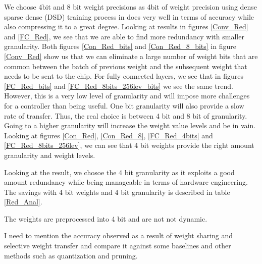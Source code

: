 \documentclass[conference]{IEEEtran}
\begin{document}
We choose 4bit and 8 bit weight precisions as 4bit of weight precision using dense sparse dense (DSD) training process in \cite{han2016dsd} does very well in terms of accuracy while also compressing it to a great degree. Looking at results in figures \ref{Conv_Red} and \ref{FC_Red}, we see that 
we are able to find more redundancy with smaller granularity. Both figures \ref{Con_Red_bits} and \ref{Con_Red_8_bits} in figure \ref{Conv_Red} show us that we can eliminate a large number of weight bits that are common between the batch of previous weight and the subsequent weight that needs to be sent to the chip. For fully connected layers, we see that in figures \ref{FC_Red_bits} and  \ref{FC_Red_8bits_256lev_bits} we see the same trend. However, this is a very low level of granularity and will impose more challenges for a controller than being useful. One bit granularity will also provide a slow rate of transfer. Thus, the real choice is between 4 bit and 8 bit of granularity. Going to a higher granularity will increase the weight value levels and be in vain. Looking at figures \ref{Con_Red}, \ref{Con_Red_8}, \ref{FC_Red_4bits} and \ref{FC_Red_8bits_256lev}, we can see that 4 bit weights provide the right amount granularity and weight levels. 

Looking at the result, we chosoe the 4 bit granularity as it exploits a good amount redundancy while being manageable in terms of hardware engineering. The savings with 4 bit weights and 4 bit granularity is described in table \ref{Red_Anal}.

\color{red}
The weights are preprocessed into 4 bit and are not not dynamic. 
\color{black}

\color{magenta}
I  need to mention the accuracy observed as a result of weight sharing and selective weight transfer and compare it against some baselines and other methods such as quantization and pruning.
\color{black}
\end{document}
